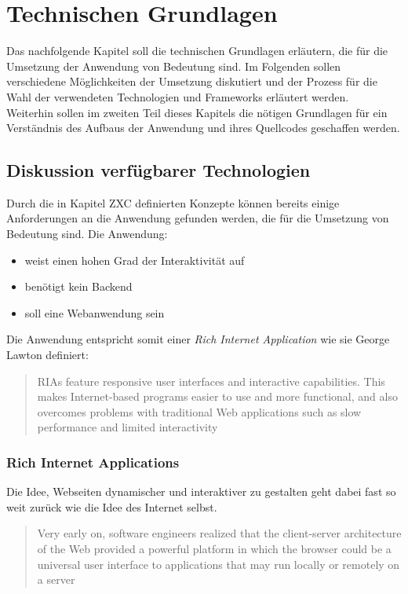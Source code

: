 \chapter{Technischen Grundlagen}
\thispagestyle{fancy}
Das nachfolgende Kapitel soll die technischen Grundlagen erläutern, die für die Umsetzung der Anwendung von Bedeutung sind. Im Folgenden sollen verschiedene Möglichkeiten der Umsetzung diskutiert und der Prozess für die Wahl der verwendeten Technologien und Frameworks erläutert werden.\\
Weiterhin sollen im zweiten Teil dieses Kapitels die nötigen Grundlagen für ein Verständnis des Aufbaus der Anwendung und ihres Quellcodes geschaffen werden.

\section{Diskussion verfügbarer Technologien}
Durch die in Kapitel ZXC definierten Konzepte können bereits einige Anforderungen an die Anwendung gefunden werden, die für die Umsetzung von Bedeutung sind.
Die Anwendung:

\begin{itemize}
  \item weist einen hohen Grad der Interaktivität auf
  \item benötigt kein Backend
  \item soll eine Webanwendung sein
\end{itemize}

Die Anwendung entspricht somit einer \textit{Rich Internet Application} wie sie George Lawton definiert:

\begin{quote}
  RIAs feature responsive user interfaces and interactive capabilities. This makes Internet-based programs easier to use and more functional, and also overcomes problems with traditional Web applications such as slow performance and limited interactivity \cite{lawton2008new}
\end{quote}

\subsection{Rich Internet Applications}
Die Idee, Webseiten dynamischer und interaktiver zu gestalten geht dabei fast so weit zurück wie die Idee des Internet selbst.

\begin{quote}
  Very early on, software engineers realized that the client-server architecture of the Web provided a powerful platform in which the browser could be a universal user interface to applications that may run locally or remotely on a server \cite{Jazayeri:2007:TWA:1253532.1254719}
\end{quote}

